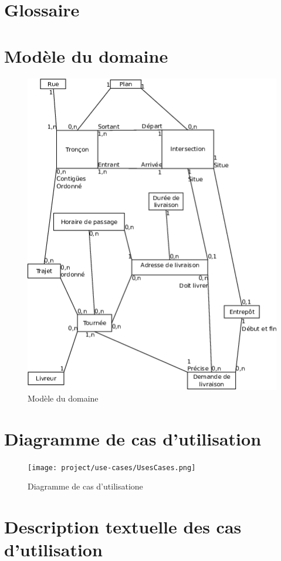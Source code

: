 \documentclass[a4paper,10pt]{article}
\begin{document}
\begin{titlepage}
  
\end{titlepage}
\tableofcontents
\pagebreak

\section{Glossaire}



\section{Modèle du domaine}
\begin{figure}[h!]
  \begin{center}
    \includegraphics[width=0.5\linewidth]{images/Modele.png}
    \caption{Modèle du domaine}
    \label{fig:modele}
  \end{center}
\end{figure}


\section{Diagramme de cas d'utilisation}
\begin{figure}[h!]
  \begin{center}
    \texttt{[image: project/use-cases/UsesCases.png]}
    \caption{Diagramme de cas d'utilisatione}
    \label{fig:useCase}
  \end{center}
\end{figure}

\section{Description textuelle des cas d’utilisation}



\end{document}
